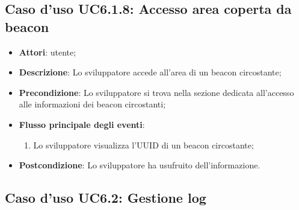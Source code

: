 \documentclass[../AnalisiDeiRequisiti.tex]{subfiles}
\begin{document}
\subsection{Caso d'uso UC6.1.8: Accesso area coperta da beacon}
\begin{itemize}
\item \textbf{Attori}: utente;
\item \textbf{Descrizione}: Lo sviluppatore accede all'area di un beacon circostante; 
      \item \textbf{Precondizione}: Lo sviluppatore si trova nella sezione dedicata all'accesso alle informazioni dei beacon circostanti;

        \item \textbf{Flusso principale degli eventi}:
          \begin{enumerate}
          \item Lo sviluppatore visualizza l'UUID di un beacon circostante;

      \end{enumerate}
    \item \textbf{Postcondizione}: Lo sviluppatore ha usufruito dell'informazione.
  \end{itemize}
\hypertarget{UC6.2}{}
\subsection{Caso d'uso UC6.2: Gestione log}
\end{document}
